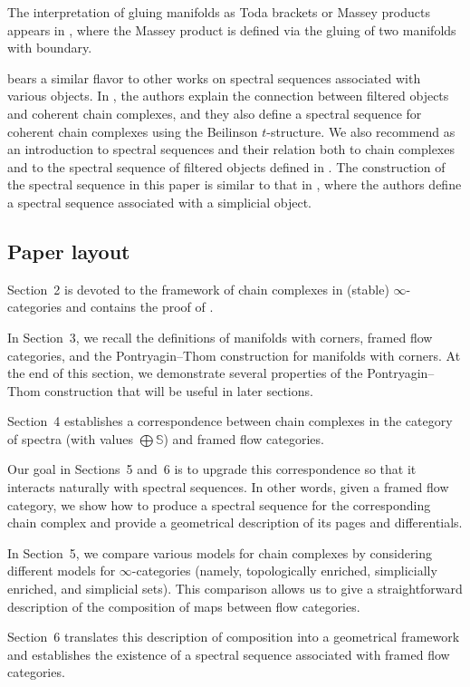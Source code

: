 The interpretation of gluing manifolds as Toda brackets or Massey products appears in \cite{alexander1972cobordism}, where the Massey product is defined via the gluing of two manifolds with boundary.

 bears a similar flavor to other works on spectral sequences associated with various objects. In \cite{Ari21}, the authors explain the connection between filtered objects and coherent chain complexes, and they also define a spectral sequence for coherent chain complexes using the Beilinson $t$-structure. We also recommend \cite{antieau2024spectral} as an introduction to spectral sequences and their relation both to chain complexes and to the spectral sequence of filtered objects defined in \cite{Lur17}. The construction of the spectral sequence in this paper is similar to that in \cite{blanc2022spectral}, where the authors define a spectral sequence associated with a simplicial object.

\subsection*{Paper layout}
Section~2 is devoted to the framework of chain complexes in (stable) $\infty$-categories and contains the proof of .

In Section~3, we recall the definitions of manifolds with corners, framed flow categories, and the Pontryagin–Thom construction for manifolds with corners. At the end of this section, we demonstrate several properties of the Pontryagin–Thom construction that will be useful in later sections.

Section~4 establishes a correspondence between chain complexes in the category of spectra (with values $\bigoplus \mathbb{S}$) and framed flow categories.

Our goal in Sections~5 and~6 is to upgrade this correspondence so that it interacts naturally with spectral sequences. In other words, given a framed flow category, we show how to produce a spectral sequence for the corresponding chain complex and provide a geometrical description of its pages and differentials.

In Section~5, we compare various models for chain complexes by considering different models for $\infty$-categories (namely, topologically enriched, simplicially enriched, and simplicial sets). This comparison allows us to give a straightforward description of the composition of maps between flow categories.

Section~6 translates this description of composition into a geometrical framework and establishes the existence of a spectral sequence associated with framed flow categories.

